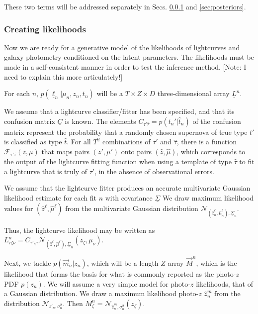 \documentclass[12pt, onecolumn]{emulateapj}
\newcommand{\textul}{\underline}
\begin{document}
These two terms will be addressed separately in Secs. \ref{sec:likelihoods} and \ref{sec:posteriors}.

\subsubsection{Creating likelihoods}
\label{sec:likelihoods}

Now we are ready for a generative model of the likelihoods of lightcurves and galaxy photometry conditioned on the latent parameters.  The likelihoods must be made in a self-consistent manner in order to test the inference method.  [Note: I need to explain this more articulately!]  

For each $n$, $p(\textul{\ell}_{n} | \mu_{n}, z_{n}, t_{n})$ will be a $T\times Z\times D$ three-dimensional array $\textul{L}^{n}$.  

We assume that a lightcurve classifier/fitter has been specified, and that its confusion matrix $\textul{C}$ is known.  The elements $C_{\tau'\hat{\tau}} = p(t_{n}' | \hat{t}_{n})$ of the confusion matrix represent the probability that a randomly chosen supernova of true type $t'$ is classified as type $\hat{t}$.  For all $T^{2}$ combinations of $\tau'$ and $\hat{\tau}$, there is a function $\mathcal{F}_{\tau'\hat{\tau}}(z, \mu)$ that maps pairs $(z', \mu')$ onto pairs $(\hat{z}, \hat{\mu})$, which corresponds to the output of the lightcurve fitting function when using a template of type $\hat{\tau}$ to fit a lightcurve that is truly of $\tau'$, in the absence of observational errors.  

We assume that the lightcurve fitter produces an accurate multivariate Gaussian likelihood estimate for each fit $n$ with covariance $\textul{\Sigma}$  We draw maximum likelihood values for $(\hat{z}^{\ell}, \hat{\mu}^{\ell})$ from the multivariate Gaussian distribution $\mathcal{N}_{(\hat{z}^{\ell}_{n}, \hat{\mu}^{\ell}_{n}), \textul{\Sigma}_{n}}$.  

Thus, the lightcurve likelihood may be written as $L^{n}_{\tau\zeta\nu} = C_{\tau'_{n}\tau}\mathcal{N}_{(\hat{z}^{\ell}, \hat{\mu}^{\ell}), \textul{\Sigma}_{n}}(z_{\zeta}, \mu_{\nu})$.

Next, we tackle $p(\vec{m}_{n} | z_{n})$, which will be a length $Z$ array $\vec{M}^{n}$, which is the likelihood that forms the basis for what is commonly reported as the photo-$z$ PDF $p(z_{n})$.   We will assume a very simple model for photo-$z$ likelihoods, that of a Gaussian distribution.  We draw a maximum likelihood photo-$z$ $\hat{z}_{n}^{m}$ from the distribution $\mathcal{N}_{z'_{n}, \sigma_{n}^{2}}$.  Then $M^{n}_{\zeta}=\mathcal{N}_{\hat{z}_{n}^{m}, \sigma_{n}^{2}}(z_{\zeta})$.
\end{document}

